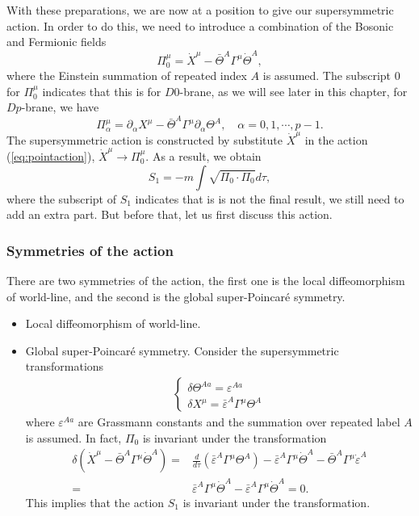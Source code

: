 \documentclass[graybox,envcountchap,sectrefs]{svmono}
\begin{document}
With these preparations, we are now at a position to give our supersymmetric action.
In order to do this, we need to introduce a combination of the Bosonic and Fermionic fields
\begin{equation}
\Pi_{0}^{\mu}=\dot{X}^{\mu}-\bar{\Theta}^A \Gamma^{\mu}\dot{\Theta}^A,	
\end{equation}
where the Einstein summation of repeated index $A$ is assumed. The subscript $0$ for $\Pi_{0}^{\mu}$ indicates that this is for $D0$-brane, as we will see later in this chapter, for $Dp$-brane, we have
\begin{equation}
\Pi^{\mu}_{\alpha}=\partial_{\alpha}X^{\mu}-\bar{\Theta}^A\Gamma^{\mu}\partial_{\alpha}\Theta^A, \quad \alpha=0,1,\cdots,p-1.
\end{equation}
The supersymmetric action is constructed by substitute $\dot{X}^{\mu}$ in the action (\ref{eq:pointaction}), $\dot{X}^{\mu}\to \Pi_{0}^{\mu}$. As a result, we obtain
\begin{equation}
S_1=-m\int \sqrt{\Pi_0\cdot \Pi_0}d\tau,	
\end{equation}
where the subscript of $S_1$ indicates that is is not the final result, we still need to add an extra part. But before that, let us first discuss this action.
\subsubsection*{Symmetries of the  action}
There are two symmetries of the action, the first one is the local diffeomorphism of world-line, and the second is the global super-Poincar\'{e} symmetry.
\begin{itemize}
\item Local diffeomorphism of world-line.
\item Global super-Poincar\'{e} symmetry. Consider the supersymmetric transformations
\begin{align}\label{eq:SUSYTrans}
\begin{cases}
	\delta \Theta^{A a}=\varepsilon^{A a} \\
\delta X^{\mu}=\bar{\varepsilon}^{A} \Gamma^{\mu} \Theta^{A}
\end{cases}
\end{align}
where $\varepsilon^{Aa}$ are Grassmann constants and the summation over repeated label $A$ is assumed. In fact, $\Pi_0$ is invariant under the transformation
\begin{align}\label{eq:PI}
\delta\left(\dot{X}^{\mu}-\bar{\Theta}^{A} \Gamma^{\mu} \dot{\Theta}^{A}\right)
=&\frac{d}{d \tau}\left(\bar{\varepsilon}^{A} \Gamma^{\mu} \Theta^{A}\right)-\bar{\varepsilon}^{A} \Gamma^{\mu} \dot{\Theta}^{A}-\bar{\Theta}^{A} \Gamma^{\mu} \dot{\varepsilon}^{A} \nonumber\\
=&\bar{\varepsilon}^{A} \Gamma^{\mu} \dot{\Theta}^{A}-\bar{\varepsilon}^{A} \Gamma^{\mu} \dot{\Theta}^{A}=0.	
\end{align}
This implies that the action $S_1$ is invariant under the transformation.
\end{itemize}
\end{document}
